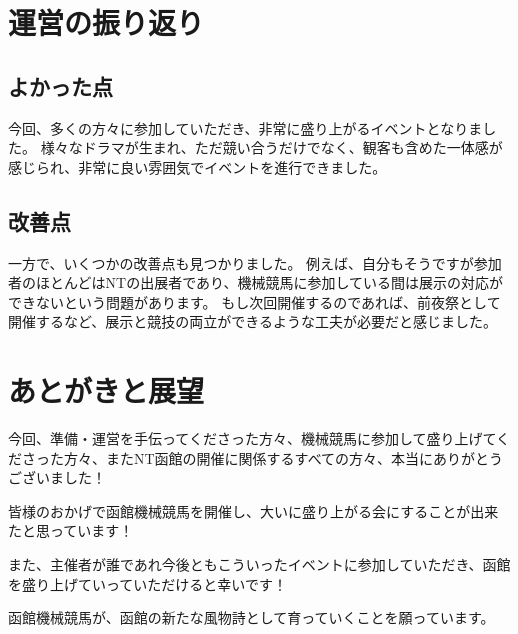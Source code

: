 \chapter{運営の振り返り}
\section{よかった点}
今回、多くの方々に参加していただき、非常に盛り上がるイベントとなりました。
様々なドラマが生まれ、ただ競い合うだけでなく、観客も含めた一体感が感じられ、非常に良い雰囲気でイベントを進行できました。

\section{改善点}
一方で、いくつかの改善点も見つかりました。
例えば、自分もそうですが参加者のほとんどはNTの出展者であり、機械競馬に参加している間は展示の対応ができないという問題があります。
もし次回開催するのであれば、前夜祭として開催するなど、展示と競技の両立ができるような工夫が必要だと感じました。

\chapter{あとがきと展望}
今回、準備・運営を手伝ってくださった方々、機械競馬に参加して盛り上げてくださった方々、またNT函館の開催に関係するすべての方々、本当にありがとうございました！

皆様のおかげで函館機械競馬を開催し、大いに盛り上がる会にすることが出来たと思っています！

また、主催者が誰であれ今後ともこういったイベントに参加していただき、函館を盛り上げていっていただけると幸いです！

函館機械競馬が、函館の新たな風物詩として育っていくことを願っています。